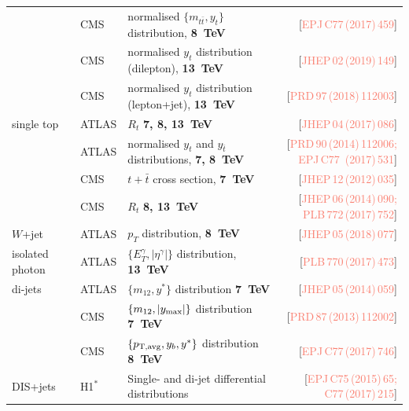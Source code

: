 \documentclass{beamer}
\begin{document}
\begin{frame}
\begin{tabularx}{\textwidth}{llXr}
            & CMS         & normalised $\{m_{t\bar{t}},y_t\}$ distribution, {\bf 8~TeV}      & [{\textcolor{salmon}{EPJ\,C77\,(2017)\,459}}]\\
            & CMS         & normalised $y_t$ distribution (dilepton), {\bf 13~TeV}           & [{\textcolor{salmon}{JHEP\,02\,(2019)\,149}}]\\
            & CMS         & normalised $y_t$ distribution (lepton+jet), {\bf 13~TeV}         & [{\textcolor{salmon}{PRD\,97\,(2018)\,112003}}]\\ 
 \midrule
 \alert{single top} 
            & ATLAS       & $R_t$ {\bf 7, 8, 13~TeV}                                         & [{\textcolor{salmon}{JHEP\,04\,(2017)\,086}}]\\
            & ATLAS       & normalised $y_t$ and $y_{\bar{t}}$ distributions, {\bf 7, 8~TeV} & [{\textcolor{salmon}{PRD\,90\,(2014)\,112006; EPJ\,C77\, (2017)\,531}}]\\
            & CMS         & $t+\bar{t}$ cross section, {\bf 7~TeV}                           & [{\textcolor{salmon}{JHEP\,12\,(2012)\,035}}]\\
            & CMS         & $R_t$ {\bf 8, 13~TeV}                                            & [{\textcolor{salmon}{JHEP\,06\,(2014)\,090; PLB\,772\,(2017)\,752}}]\\
 \alert{$W$+jet}    
            & ATLAS       & $p_T$ distribution, {\bf 8~TeV}                                  & [{\textcolor{salmon}{JHEP\,05\,(2018)\,077}}]\\        
 \alert{isolated photon} 
            & ATLAS       & $\{E_T^\gamma,|\eta^\gamma|\}$ distribution, {\bf 13~TeV}        & [{\textcolor{salmon}{PLB\,770\,(2017)\,473}}]\\     
 \alert{di-jets}    
            & ATLAS       & $\{m_{12},y^*\}$ distribution {\bf 7~TeV}                        & [{\textcolor{salmon}{JHEP\,05\,(2014)\,059}}]\\
            & CMS         & $\{m_{12},|y_{\rm max}|\}$ distribution {\bf 7~TeV}              & [{\textcolor{salmon}{PRD\,87\,(2013)\,112002}}]\\
            & CMS         & $\{p_{\rm T,avg},y_b,y^*\}$ distribution {\bf 8~TeV}             & [{\textcolor{salmon}{EPJ\,C77\,(2017)\,746}}]\\           
 \alert{DIS+jets}   
            & H1$^*$      & Single- and di-jet differential distributions                    & [{\textcolor{salmon}{EPJ\,C75\,(2015)\,65; C77\,(2017)\,215}}]\\
 \bottomrule 

\end{tabularx}
\end{frame}
\end{document}
